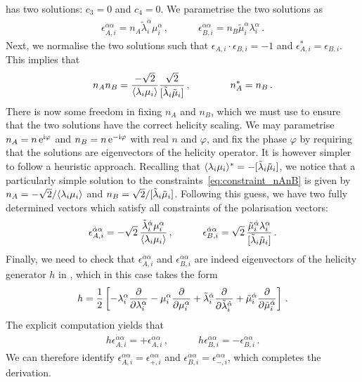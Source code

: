 \begin{enumerate}[a)]
\begin{align}
\end{align}
has two solutions: $c_3=0$ and $c_4 = 0$. We parametrise the two solutions as
\begin{align}
\epsilon_{A,i}^{\dot{\alpha}\alpha} = n_A \tilde{\lambda}_i^{\dot{\alpha}} \mu_i^{\alpha} \,, \qquad \quad
\epsilon_{B,i}^{\dot{\alpha}\alpha} = n_B \tilde{\mu}_i^{\dot{\alpha}} \lambda_i^{\alpha} \,.
\end{align}
Next, we normalise the two solutions such that $\epsilon_{A,i} \cdot \epsilon_{B,i}=-1$ and $\epsilon_{A,i}^* = \epsilon_{B,i}$. This implies that 
\begin{align} \label{eq:constraint_nAnB}
n_A n_B = \frac{-\sqrt{2}}{\langle \lambda_i \mu_i \rangle} \frac{\sqrt{2}}{[ \tilde{\lambda}_i \tilde{\mu}_i ]} \,, \qquad \qquad n_A^*=n_B \,.
\end{align}
There is now some freedom in fixing $n_A$ and $n_B$, which we must use to ensure that the two solutions have the correct helicity scaling. We may parametrise $n_A = n \, \mathrm{e}^{\mathrm{i} \varphi}$ and $n_B = n \, \mathrm{e}^{-\mathrm{i} \varphi}$ with real $n$ and $\varphi$, and fix the phase $\varphi$ by requiring that the solutions are eigenvectors of the helicity operator. It is however simpler to follow a heuristic approach. Recalling that $\langle \lambda_i \mu_i \rangle^* = - [ \tilde{\lambda}_i \tilde{\mu}_i ]$, we notice that a particularly simple solution to the constraints~\eqref{eq:constraint_nAnB} is given by $n_A = -\sqrt{2}/\langle \lambda_i \mu_i \rangle$ and $n_B =  \sqrt{2}/[ \tilde{\lambda}_i \tilde{\mu}_i ]$. Following this guess, we have two fully determined vectors which satisfy all constraints of the polarisation vectors:
\begin{align}
\epsilon_{A,i}^{\dot{\alpha}\alpha} = -\sqrt{2} \, \frac{\tilde{\lambda}_i^{\dot{\alpha}} \mu_i^{\alpha}}{\langle \lambda_i \mu_i \rangle} \,, \qquad \quad
\epsilon_{B,i}^{\dot{\alpha}\alpha} = \sqrt{2} \, \frac{\tilde{\mu}_i^{\dot{\alpha}} \lambda_i^{\alpha}}{[ \tilde{\lambda}_i \tilde{\mu}_i ]}  \,.
\end{align}
Finally, we need to check that $\epsilon_{A,i}^{\dot{\alpha}\alpha}$ and $\epsilon_{B,i}^{\dot{\alpha}\alpha}$ are indeed eigenvectors of the helicity generator $h$ in , which in this case takes the form
\begin{align}
h = \frac{1}{2} \left[
-\lambda_{i}^{\alpha}\frac{\partial}{\partial \lambda_{i}^{\alpha}} -\mu_{i}^{\alpha}\frac{\partial}{\partial \mu_{i}^{\alpha}}  + \tilde\lambda_{i}^{{\dot{\alpha}}}\frac{\partial}{\partial \tilde\lambda_{i}^{{\dot{\alpha}}}} +
 \tilde{\mu}_{i}^{{\dot{\alpha}}}\frac{\partial}{\partial \tilde{\mu}_{i}^{{\dot{\alpha}}}}
\right]\, .
\end{align}
The explicit computation yields that
\begin{align} 
h \epsilon_{A,i}^{\dot{\alpha}\alpha} = +\epsilon_{A,i}^{\dot{\alpha}\alpha}\,, \qquad \quad h \epsilon_{B,i}^{\dot{\alpha}\alpha} = -\epsilon_{B,i}^{\dot{\alpha}\alpha}\,.
\end{align}
We can therefore identify $\epsilon_{A,i}^{\dot{\alpha}\alpha}=\epsilon_{+,i}^{\dot{\alpha}\alpha}$ and $\epsilon_{B,i}^{\dot{\alpha}\alpha}=\epsilon_{-,i}^{\dot{\alpha}\alpha}$, which completes the derivation.


\end{enumerate}
